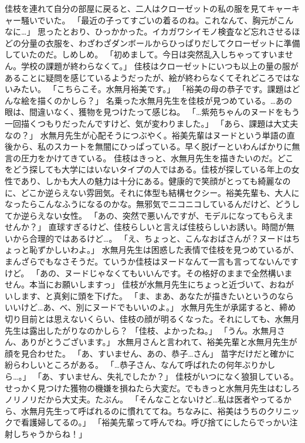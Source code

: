 佳枝を連れて自分の部屋に戻ると、二人はクローゼットの私の服を見てキャーキャー騒いでいた。
「最近の子ってすごいの着るのね。これなんて、胸元がこんなに…」
思ったとおり、ひっかかった。イカガワシイモノ検査など忘れさせるほどの分量の衣服を、わざわざダンボールからひっぱりだしてクローゼットに準備していたのだ。しめしめ。
「初めまして。今日は突然乱入しちゃってすいません。学校の課題が終わらなくて。」
佳枝はクローゼットにいつも以上の量の服があることに疑問を感じているようだったが、絵が終わらなくてそれどころではないみたい。
「こちらこそ。水無月裕美です。」
「裕美の母の恭子です。課題はどんな絵を描くのかしら？」
名乗った水無月先生を佳枝が見つめている。…あの眼は、間違いなく、獲物を見つけたって感じね。
「…紫苑ちゃんのヌードをもう一回描くつもりだったんですけど、気が変わりました。」
「あら、課題は大丈夫なの？」
水無月先生が心配そうにつぶやく。裕美先輩はヌードという単語の直後から、私のスカートを無闇にひっぱっている。早く脱げーといわんばかりに無言の圧力をかけてきている。
佳枝はきっと、水無月先生を描きたいのだ。どこをどう探しても大学にはいないタイプの人ではある。佳枝が探している年上の女性であり、しかも大人の魅力は十分にある。健康的で笑顔がとっても綺麗なのに、どこか逆らえない雰囲気。それに体型も結構セクシー。裕美先輩も、大人になったらこんなふうになるのかな。無邪気でニコニコしているんだけど、どうしてか逆らえない女性。
「あの、突然で悪いんですが、モデルになってもらえませんか？」
直球すぎるけど、佳枝らしいと言えば佳枝らしいお誘い。時間が無いから合理的ではあるけど…。
「え、ちょっと、こんなおばさんが？ヌードはちょっと恥ずかしいわよ。」
水無月先生は困惑した表情で佳枝を見つめているが、まんざらでもなさそうだ。ていうか佳枝はヌードなんて一言も言ってないんですけど。
「あの、ヌードじゃなくてもいいんです。その格好のままで全然構いません。本当にお願いしますっ」
佳枝が水無月先生にちょっと近づいて、おねがいします、と真剣に頭を下げた。
「ま、まあ、あなたが描きたいというのならいいけど…あ、べ、別にヌードでもいいのよ。」
水無月先生が承諾すると、締め切り目前とは思えないくらい、佳枝の顔が明るくなった。それにしても、水無月先生は露出したがりなのかしら？
「佳枝、よかったね。」
「うん。水無月さん、ありがとうございます。」
水無月さんと言われて、裕美先輩と水無月先生が顔を見合わせた。
「あ、すいません、あの、恭子…さん」
苗字だけだと確かに紛らわしいところがある。
「…恭子さん、なんて呼ばれたの何年ぶりかしら…。」
「あ、すいません、失礼でしたか？」
佳枝がいつになく狼狽している。せっかく見つけた獲物の機嫌を損ねたら大変だ。でもきっと水無月先生はむしろノリノリだから大丈夫。たぶん。
「そんなことないけど…私は医者やってるから、水無月先生って呼ばれるのに慣れててね。ちなみに、裕美はうちのクリニックで看護婦してるの。」
「裕美先輩って呼んでね。呼び捨てにしたらでっかい注射しちゃうからね！」
